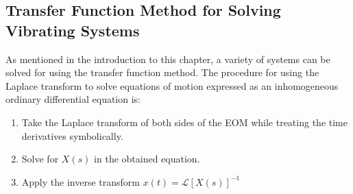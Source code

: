 \documentclass[12pt,letter]{article}
\numberwithin{ex}{section} %
\numberwithin{re}{section} %
\newcommand{\Laplace}[1]{\ensuremath{\mathcal{L}{\left[#1\right]}}}
\begin{document}
		\subsection{Transfer Function Method for Solving Vibrating Systems}
		
			As mentioned in the introduction to this chapter, a variety of systems can be solved for using the transfer function method. The procedure for using the Laplace transform to solve equations of motion expressed as an inhomogeneous ordinary differential equation is:
			\begin{enumerate}
				\item Take the Laplace transform of both sides of the EOM while treating the time derivatives symbolically.
				\item Solve for $X(s)$ in the obtained equation.
				\item Apply the inverse transform $x(t) = \Laplace{X(s)}^{-1}$
			\end{enumerate}
				
\end{document}
